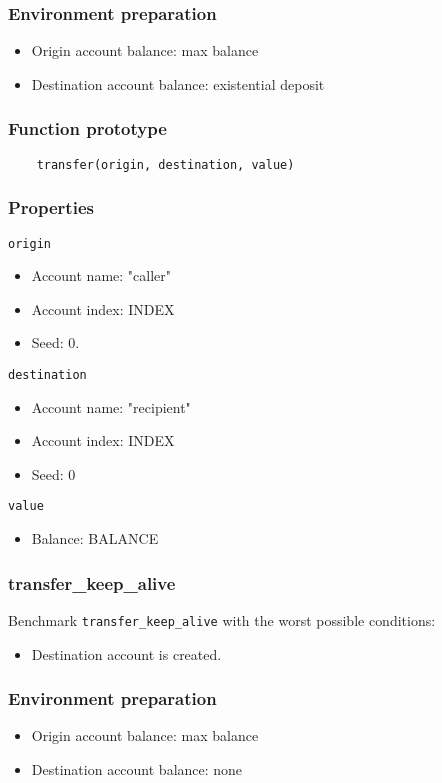 \documentclass[11pt,a4paper]{article}
\begin{document}
\subsubsection*{Environment preparation}
\begin{itemize}
\item Origin account balance: max balance
\item Destination account balance: existential deposit
\end{itemize}

\subsubsection*{Function prototype}
\begin{verbatim}
    transfer(origin, destination, value)
\end{verbatim}

\subsubsection*{Properties}
\verb|origin|
\begin{itemize}
\item Account name: "caller"
\item Account index: INDEX
\item Seed: 0.
\end{itemize}
\verb|destination|
\begin{itemize}
\item Account name: "recipient"
\item Account index: INDEX
\item Seed: 0
\end{itemize}
\verb|value|
\begin{itemize}
\item Balance: BALANCE
\end{itemize}

\subsubsection{transfer\_keep\_alive}

Benchmark \verb|transfer_keep_alive| with the worst possible conditions:
\begin{itemize}
\item Destination account is created.
\end{itemize}

\subsubsection*{Environment preparation}
\begin{itemize}
\item Origin account balance: max balance
\item Destination account balance: none
\end{itemize}
\end{document}
